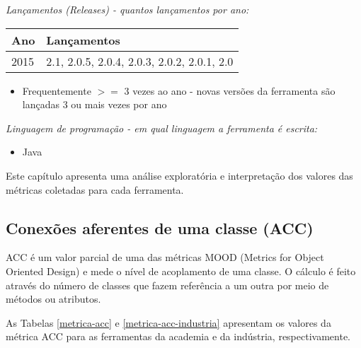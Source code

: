 \begin{description}

  \item {\it Lançamentos ({\it Releases}) - quantos lançamentos por ano:}
    \begin{table}[h!]
      \centering
      \begin{tabular}{| l | l |}
        \hline
        Ano  & Lançamentos                                 \\
        \hline
        2015 & 2.1, 2.0.5, 2.0.4, 2.0.3, 2.0.2, 2.0.1, 2.0 \\
        \hline
      \end{tabular}
    \end{table}
    \begin{itemize}
      \item Frequentemente $>=$ 3 vezes ao ano - novas versões da ferramenta são lançadas 3 ou mais vezes por ano
    \end{itemize}

  \item {\it Linguagem de programação - em qual linguagem a ferramenta é escrita:}
    \begin{itemize}
      \item Java
    \end{itemize}

\end{description}

{Este capítulo apresenta uma análise exploratória e interpretação dos valores das métricas coletadas para cada ferramenta.}
\label{analise-metricas}

\subsection{Conexões aferentes de uma classe (ACC)}

ACC é um valor parcial de uma das métricas MOOD (Metrics for Object Oriented
Design) \cite{Brito1994} e mede o nível de acoplamento de uma classe. O
cálculo é feito através do número de classes que fazem referência a um outra
por meio de métodos ou atributos.

As Tabelas \ref{metrica-acc} e \ref{metrica-acc-industria} apresentam os
valores da métrica ACC para as ferramentas da academia e da indústria,
respectivamente.


